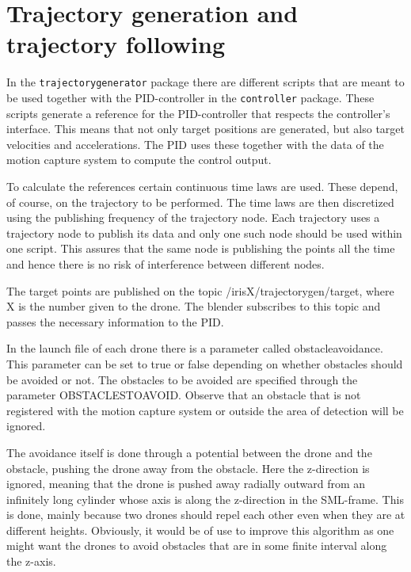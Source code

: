 \documentclass[titlepage,11pt,a4paper]{article}
\begin{document}
\section{Trajectory generation and trajectory following}
\label{sec:trajectory}

In the \texttt{trajectory\textunderscore generator} package there are
different scripts that are meant to be used together with the
PID-controller in the \texttt{controller} package. These scripts
generate a reference for the PID-controller that respects the
controller's interface. This means that not only target positions are
generated, but also target velocities and accelerations. The PID uses
these together with the data of the motion capture system to compute
the control output.

To calculate the references certain continuous time laws are
used. These depend, of course, on the trajectory to be performed. The
time laws are then discretized using the publishing frequency of the
trajectory node. Each trajectory uses a trajectory node to publish its
data and only one such node should be used within one script. This
assures that the same node is publishing the points all the time and
hence there is no risk of interference between different nodes.

The target points are published on the topic
/irisX/trajectory\textunderscore gen/target, where X is the number
given to the drone. The blender subscribes to this topic and passes
the necessary information to the PID.

In the launch file of each drone there is a parameter called
obstacle\textunderscore avoidance. This parameter can be set to true
or false depending on whether obstacles should be avoided or not. The
obstacles to be avoided are specified through the parameter
OBSTACLES\textunderscore TO\textunderscore AVOID. Observe that an
obstacle that is not registered with the motion capture system or
outside the area of detection will be ignored.

The avoidance itself is done through a potential between the drone and
the obstacle, pushing the drone away from the obstacle. Here the
z-direction is ignored, meaning that the drone is pushed away radially
outward from an infinitely long cylinder whose axis is along the
z-direction in the SML-frame.  This is done, mainly because two drones
should repel each other even when they are at different
heights. Obviously, it would be of use to improve this algorithm as
one might want the drones to avoid obstacles that are in some finite
interval along the z-axis.
\end{document}
